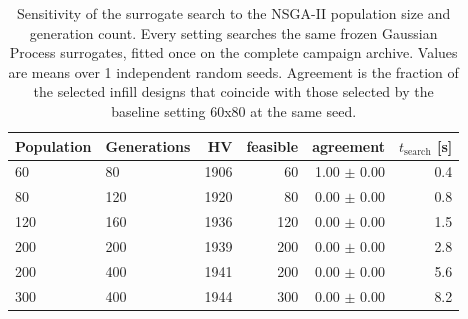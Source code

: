 \begin{table}[htbp]
\centering
\caption{Sensitivity of the surrogate search to the NSGA-II population size and generation count. Every setting searches the same frozen Gaussian Process surrogates, fitted once on the complete campaign archive. Values are means over 1 independent random seeds. Agreement is the fraction of the selected infill designs that coincide with those selected by the baseline setting 60x80 at the same seed.}
\label{tab:nsga_sensitivity}
\begin{tabular}{llrrrr}
\toprule
Population & Generations & HV & feasible & agreement & $t_{\mathrm{search}}$ [s] \\
\midrule
60 & 80 & 1906 & 60 & 1.00 $\pm$ 0.00 & 0.4 \\
80 & 120 & 1920 & 80 & 0.00 $\pm$ 0.00 & 0.8 \\
120 & 160 & 1936 & 120 & 0.00 $\pm$ 0.00 & 1.5 \\
200 & 200 & 1939 & 200 & 0.00 $\pm$ 0.00 & 2.8 \\
200 & 400 & 1941 & 200 & 0.00 $\pm$ 0.00 & 5.6 \\
300 & 400 & 1944 & 300 & 0.00 $\pm$ 0.00 & 8.2 \\
\bottomrule
\end{tabular}
\end{table}
